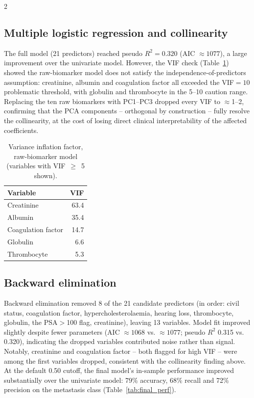 ﻿\documentclass[a4paper,10pt]{article}
\begin{document}
\begin{multicols*}{2}
\subsection{Multiple logistic regression and collinearity}
The full model (21 predictors) reached pseudo $R^2=0.320$ (AIC $\approx 1077$), a large improvement over the univariate model. However, the VIF check (Table~\ref{tab:vif}) showed the raw-biomarker model does not satisfy the independence-of-predictors assumption: creatinine, albumin and coagulation factor all exceeded the VIF$=10$ problematic threshold, with globulin and thrombocyte in the 5--10 caution range. Replacing the ten raw biomarkers with PC1--PC3 dropped every VIF to $\approx$1--2, confirming that the PCA components -- orthogonal by construction -- fully resolve the collinearity, at the cost of losing direct clinical interpretability of the affected coefficients.

\begin{table}[H]
\centering
\caption{Variance inflation factor, raw-biomarker model (variables with VIF~$\geq$~5 shown).}
\label{tab:vif}
\begin{tabular}{lr}
\toprule
Variable & VIF \\
\midrule
Creatinine & 63.4 \\
Albumin & 35.4 \\
Coagulation factor & 14.7 \\
Globulin & 6.6 \\
Thrombocyte & 5.3 \\
\bottomrule
\end{tabular}
\end{table}

\subsection{Backward elimination}
Backward elimination removed 8 of the 21 candidate predictors (in order: civil status, coagulation factor, hypercholesterolaemia, hearing loss, thrombocyte, globulin, the PSA$>$100 flag, creatinine), leaving 13 variables. Model fit improved slightly despite fewer parameters (AIC $\approx 1068$ vs. $\approx 1077$; pseudo $R^2$ 0.315 vs. 0.320), indicating the dropped variables contributed noise rather than signal. Notably, creatinine and coagulation factor -- both flagged for high VIF -- were among the first variables dropped, consistent with the collinearity finding above. At the default 0.50 cutoff, the final model's in-sample performance improved substantially over the univariate model: 79\% accuracy, 68\% recall and 72\% precision on the metastasis class (Table~\ref{tab:final_perf}).


\end{multicols*}
\end{document}
